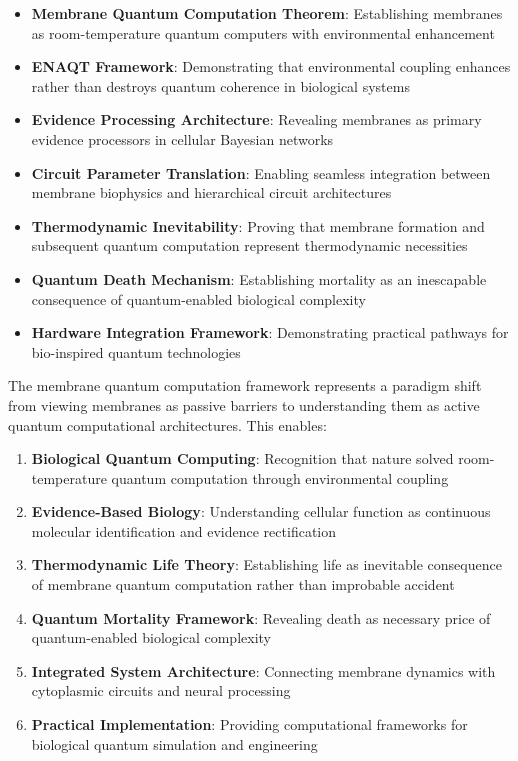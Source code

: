 \documentclass[12pt,a4paper]{article}
\begin{document}
\begin{itemize}
\item \textbf{Membrane Quantum Computation Theorem}: Establishing membranes as room-temperature quantum computers with environmental enhancement
\item \textbf{ENAQT Framework}: Demonstrating that environmental coupling enhances rather than destroys quantum coherence in biological systems
\item \textbf{Evidence Processing Architecture}: Revealing membranes as primary evidence processors in cellular Bayesian networks
\item \textbf{Circuit Parameter Translation}: Enabling seamless integration between membrane biophysics and hierarchical circuit architectures
\item \textbf{Thermodynamic Inevitability}: Proving that membrane formation and subsequent quantum computation represent thermodynamic necessities
\item \textbf{Quantum Death Mechanism}: Establishing mortality as an inescapable consequence of quantum-enabled biological complexity
\item \textbf{Hardware Integration Framework}: Demonstrating practical pathways for bio-inspired quantum technologies
\end{itemize}

The membrane quantum computation framework represents a paradigm shift from viewing membranes as passive barriers to understanding them as active quantum computational architectures. This enables:

\begin{enumerate}
\item \textbf{Biological Quantum Computing}: Recognition that nature solved room-temperature quantum computation through environmental coupling
\item \textbf{Evidence-Based Biology}: Understanding cellular function as continuous molecular identification and evidence rectification
\item \textbf{Thermodynamic Life Theory}: Establishing life as inevitable consequence of membrane quantum computation rather than improbable accident
\item \textbf{Quantum Mortality Framework}: Revealing death as necessary price of quantum-enabled biological complexity
\item \textbf{Integrated System Architecture}: Connecting membrane dynamics with cytoplasmic circuits and neural processing
\item \textbf{Practical Implementation}: Providing computational frameworks for biological quantum simulation and engineering
\end{enumerate}
\end{document}

